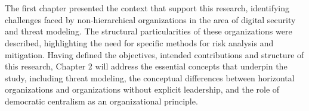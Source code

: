 \section*{} 
The first chapter presented the context that support this research, identifying
challenges faced by non-hierarchical organizations in the area of digital
security and threat modeling. The structural particularities of these
organizations were described, highlighting the need for specific methods for
risk analysis and mitigation. Having defined the objectives, intended
contributions and structure of this research, Chapter 2 will address the
essential concepts that underpin the study, including threat modeling, the
conceptual differences between horizontal organizations and organizations
without explicit leadership, and the role of democratic centralism as an
organizational principle.
